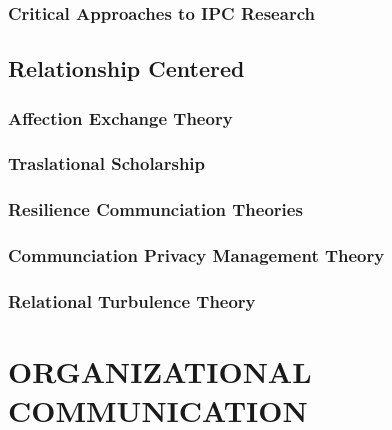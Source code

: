 \documentclass[
]{book}
\begin{document}
\hypertarget{critical-approaches-to-ipc-research}{%
\section{Critical Approaches to IPC Research}\label{critical-approaches-to-ipc-research}}

\hypertarget{relationship-centered}{%
\chapter{Relationship Centered}\label{relationship-centered}}

\hypertarget{affection-exchange-theory-1}{%
\section{Affection Exchange Theory}\label{affection-exchange-theory-1}}

\hypertarget{traslational-scholarship}{%
\section{Traslational Scholarship}\label{traslational-scholarship}}

\hypertarget{resilience-communciation-theories}{%
\section{Resilience Communciation Theories}\label{resilience-communciation-theories}}

\hypertarget{communciation-privacy-management-theory}{%
\section{Communciation Privacy Management Theory}\label{communciation-privacy-management-theory}}

\hypertarget{relational-turbulence-theory}{%
\section{Relational Turbulence Theory}\label{relational-turbulence-theory}}

\hypertarget{part-organizational-communication}{%
\part{ORGANIZATIONAL COMMUNICATION}\label{part-organizational-communication}}
\end{document}

